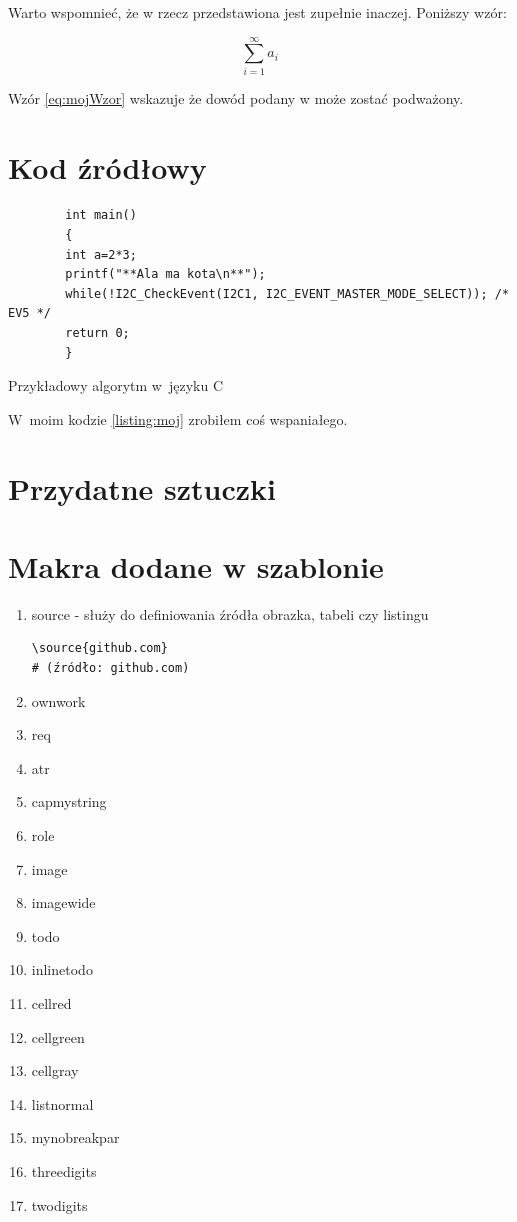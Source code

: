 \lipsum[19-20] Warto wspomnieć, że w\cite{aizawa_groundwater_2009} rzecz przedstawiona jest zupełnie inaczej. Poniższy wzór:

\begin{equation}
    \sum_{i=1}^{\infty}a_i
    \label{eq:mojWzor}
\end{equation}

Wzór \ref{eq:mojWzor} wskazuje że dowód podany w\cite{kaleta_experimental_2005} może zostać podważony. \lipsum[9]

\section{Kod źródłowy}

\begin{listing}[h!]
    \begin{verbatim}
        int main()
        {
        int a=2*3;
        printf("**Ala ma kota\n**");
        while(!I2C_CheckEvent(I2C1, I2C_EVENT_MASTER_MODE_SELECT)); /* EV5 */
        return 0;
        }
    \end{verbatim}
    \caption{Przykładowy algorytm w~języku C~\source{\ownwork}} \label{listing:moj}
\end{listing}

W~moim kodzie \ref{listing:moj} zrobiłem coś wspaniałego. \lipsum[4]

\section{Przydatne sztuczki}
\section{Makra dodane w szablonie}
\begin{enumerate}
    \item source - służy do definiowania źródła obrazka, tabeli czy listingu

    \begin{verbatim}
\source{github.com}
# (źródło: github.com)
    \end{verbatim}

    \item ownwork
    \item req
    \item atr
    \item capmystring
    \item role
    \item image
    \item imagewide
    \item todo
    \item inlinetodo
    \item cellred
    \item cellgreen
    \item cellgray
    \item listnormal
    \item mynobreakpar
    \item threedigits
    \item twodigits

\end{enumerate}

